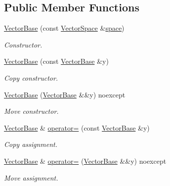 \subsection*{Public Member Functions}
\begin{DoxyCompactItemize}
\item 
\hyperlink{classSpacy_1_1VectorBase_acc9bea6ed6976ba12cb39b050af80ef3_acc9bea6ed6976ba12cb39b050af80ef3}{Vector\+Base} (const \hyperlink{classSpacy_1_1VectorSpace}{Vector\+Space} \&\hyperlink{classSpacy_1_1VectorBase_a95e87ce98f5a7646055d4e87e6024044_a95e87ce98f5a7646055d4e87e6024044}{space})
\begin{DoxyCompactList}\small\item\em Constructor. \end{DoxyCompactList}\item 
\hyperlink{classSpacy_1_1VectorBase_ade615921dc4add4c10ea7c440a28a571_ade615921dc4add4c10ea7c440a28a571}{Vector\+Base} (const \hyperlink{classSpacy_1_1VectorBase}{Vector\+Base} \&y)
\begin{DoxyCompactList}\small\item\em Copy constructor. \end{DoxyCompactList}\item 
\hyperlink{classSpacy_1_1VectorBase_a7e4fab196fdc47a6b7447204e03553d8_a7e4fab196fdc47a6b7447204e03553d8}{Vector\+Base} (\hyperlink{classSpacy_1_1VectorBase}{Vector\+Base} \&\&y) noexcept
\begin{DoxyCompactList}\small\item\em Move constructor. \end{DoxyCompactList}\item 
\hyperlink{classSpacy_1_1VectorBase}{Vector\+Base} \& \hyperlink{classSpacy_1_1VectorBase_a4a3ee139f1aff4b5dcc8714b761b4767_a4a3ee139f1aff4b5dcc8714b761b4767}{operator=} (const \hyperlink{classSpacy_1_1VectorBase}{Vector\+Base} \&y)
\begin{DoxyCompactList}\small\item\em Copy assignment. \end{DoxyCompactList}\item 
\hyperlink{classSpacy_1_1VectorBase}{Vector\+Base} \& \hyperlink{classSpacy_1_1VectorBase_a729a491f5b5574decc546ab9ed1b984c_a729a491f5b5574decc546ab9ed1b984c}{operator=} (\hyperlink{classSpacy_1_1VectorBase}{Vector\+Base} \&\&y) noexcept
\begin{DoxyCompactList}\small\item\em Move assignment. \end{DoxyCompactList}\item 

\end{DoxyCompactItemize}
